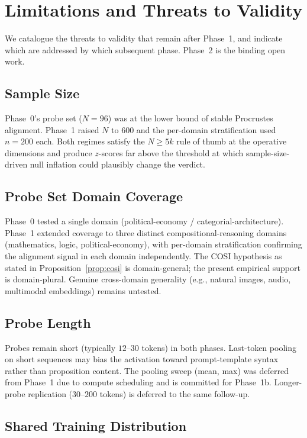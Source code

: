 \section{Limitations and Threats to Validity}
\label{sec:limitations}

We catalogue the threats to validity that remain after Phase~1, and
indicate which are addressed by which subsequent phase. Phase~2 is
the binding open work.

\subsection{Sample Size}

Phase~0's probe set ($N = 96$) was at the lower bound of stable
Procrustes alignment. Phase~1 raised $N$ to $600$ and the per-domain
stratification used $n = 200$ each. Both regimes satisfy the
$N \geq 5k$ rule of thumb at the operative dimensions and produce
$z$-scores far above the threshold at which sample-size-driven null
inflation could plausibly change the verdict.

\subsection{Probe Set Domain Coverage}

Phase~0 tested a single domain (political-economy / categorial-architecture).
Phase~1 extended coverage to three distinct compositional-reasoning
domains (mathematics, logic, political-economy), with per-domain
stratification confirming the alignment signal in each domain
independently. The COSI hypothesis as stated in
Proposition~\ref{prop:cosi} is domain-general; the present empirical
support is domain-plural. Genuine cross-domain generality (e.g.,
natural images, audio, multimodal embeddings) remains untested.

\subsection{Probe Length}

Probes remain short (typically $12$--$30$ tokens) in both phases.
Last-token pooling on short sequences may bias the activation toward
prompt-template syntax rather than proposition content. The pooling
sweep (mean, max) was deferred from Phase~1 due to compute scheduling
and is committed for Phase~1b. Longer-probe replication ($30$--$200$
tokens) is deferred to the same follow-up.

\subsection{Shared Training Distribution}

